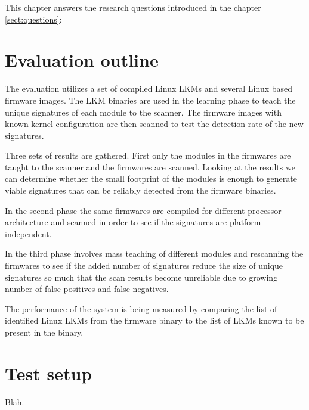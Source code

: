 
This chapter answers the research questions introduced in the chapter \ref{sect:questions}:



\section{Evaluation outline}

The evaluation utilizes a set of compiled Linux LKMs and several Linux based firmware images. The
LKM binaries are used in the learning phase to teach the unique signatures of each module to the
scanner. The firmware images with known kernel configuration are then scanned to test the detection
rate of the new signatures.

Three sets of results are gathered. First only the modules in the firmwares are taught to the
scanner and the firmwares are scanned. Looking at the results we can determine whether the small
footprint of the modules is enough to generate viable signatures that can be reliably detected from
the firmware binaries.

In the second phase the same firmwares are compiled for different processor architecture and
scanned in order to see if the signatures are platform independent.

In the third phase involves mass teaching of different modules and rescanning the firmwares to see
if the added number of signatures reduce the size of unique signatures so much that the scan
results become unreliable due to growing number of false positives and false negatives.

The performance of the system is being measured by comparing the list of identified Linux LKMs from
the firmware binary to the list of LKMs known to be present in the binary.

\section{Test setup}

Blah.
